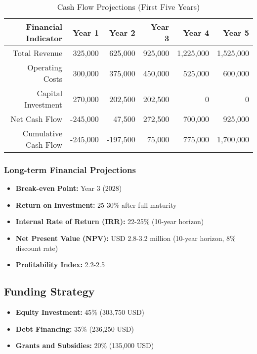 \begin{table}[h]
\centering
\begin{tabular}{|r|r|r|r|r|r|}
\hline
\textbf{Financial Indicator} & \textbf{Year 1} & \textbf{Year 2} & \textbf{Year 3} & \textbf{Year 4} & \textbf{Year 5} \\
\hline
Total Revenue & 325,000 & 625,000 & 925,000 & 1,225,000 & 1,525,000 \\
Operating Costs & 300,000 & 375,000 & 450,000 & 525,000 & 600,000 \\
Capital Investment & 270,000 & 202,500 & 202,500 & 0 & 0 \\
\hline
Net Cash Flow & -245,000 & 47,500 & 272,500 & 700,000 & 925,000 \\
Cumulative Cash Flow & -245,000 & -197,500 & 75,000 & 775,000 & 1,700,000 \\
\hline
\end{tabular}
\caption{Cash Flow Projections (First Five Years)}
\end{table}

\subsubsection{Long-term Financial Projections}
\begin{itemize}
    \item \textbf{Break-even Point:} Year 3 (2028)
    \item \textbf{Return on Investment:} 25-30\% after full maturity
    \item \textbf{Internal Rate of Return (IRR):} 22-25\% (10-year horizon)
    \item \textbf{Net Present Value (NPV):} USD 2.8-3.2 million (10-year horizon, 8\% discount rate)
    \item \textbf{Profitability Index:} 2.2-2.5
\end{itemize}

\subsection{Funding Strategy}
\begin{itemize}
    \item \textbf{Equity Investment:} 45\% (303,750 USD)
    \item \textbf{Debt Financing:} 35\% (236,250 USD)
    \item \textbf{Grants and Subsidies:} 20\% (135,000 USD)
\end{itemize}

